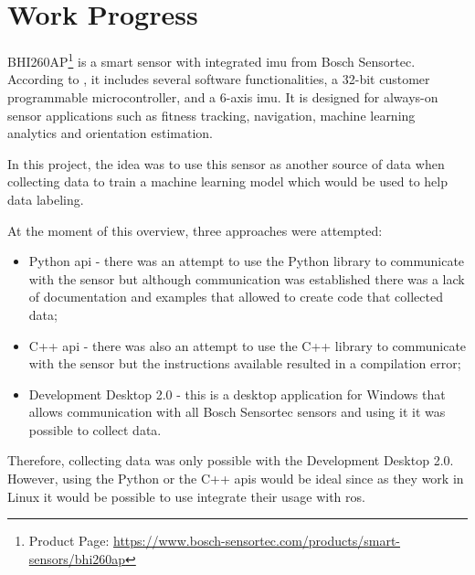 \chapter{Work Progress}
\label{chapter:work_progress}


BHI260AP\footnote{Product Page: \url{https://www.bosch-sensortec.com/products/smart-sensors/bhi260ap}} is a smart sensor with integrated \acf{imu} from Bosch Sensortec. According to \cite{BoschSensor}, it includes several software functionalities, a 32-bit customer programmable microcontroller, and a 6-axis \acs{imu}. It is designed for always-on sensor applications such as fitness tracking, navigation, machine learning analytics and orientation estimation.

In this project, the idea was to use this sensor as another source of data when collecting data to train a machine learning model which would be used to help data labeling.

At the moment of this overview, three approaches were attempted:

\begin{itemize}
    \item Python \acs{api} - there was an attempt to use the Python library to communicate with the sensor but although communication was established there was a lack of documentation and examples that allowed to create code that collected data;
    \item C++ \acs{api} - there was also an attempt to use the C++ library to communicate with the sensor but the instructions available resulted in a compilation error;
    \item Development Desktop 2.0 - this is a desktop application for Windows that allows communication with all Bosch Sensortec sensors and using it it was possible to collect data.
\end{itemize}

Therefore, collecting data was only possible with the Development Desktop 2.0. However, using the Python or the C++ \acp{api} would be ideal since as they work in Linux it would be possible to use integrate their usage with \acs{ros}.